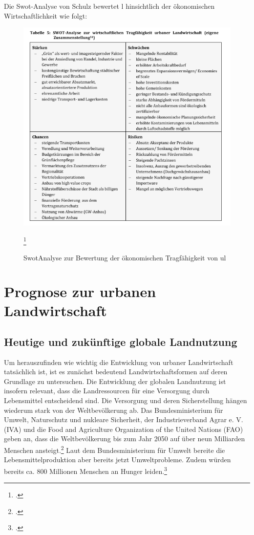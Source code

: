 \documentclass{scrartcl}
\begin{document}
 
 Die Swot-Analyse von Schulz bewertet l hinsichtlich der ökonomischen Wirtschaftlichkeit wie folgt:
 
\begin{figure}[htbp]
\centering
\includegraphics[width=14cm]{image_folder/swot_kSchulz.png}
\caption{SwotAnalyse zur Bewertung der ökonomischen Tragfähigkeit von \acs{ul}}
\label{fig:SwotUL}\footcite[S.32]{Schulz2013UrbaneLandmanagements}
\end{figure} 
 
\section{Prognose zur urbanen Landwirtschaft}


\subsection{Heutige und zukünftige globale Landnutzung}

Um herauszufinden wie wichtig die Entwicklung von urbaner Landwirtschaft tatsächlich ist, ist es zunächst bedeutend Landwirtschaftsformen auf deren Grundlage zu untersuchen. Die Entwicklung der globalen Landnutzung ist insofern relevant, dass die Landressourcen für eine Versorgung durch Lebensmittel entscheidend sind. Die Versorgung und deren Sicherstellung hängen wiederum stark von der Weltbevölkerung ab. Das Bundesministerium für Umwelt, Naturschutz und nukleare Sicherheit, der Industrieverband Agrar e. V. (IVA) und die Food and Agriculture Organization of the United Nations (FAO) geben an, dass die Weltbevölkerung bis zum Jahr 2050 auf über neun Milliarden Menschen ansteigt.\footcites[Vgl.]{BMU2016GlobaleUmweltfolgen}[sowie]{Agrar0NahrungsmittelLandwirtschaft}[und]{FAO2009How2050} Laut dem Bundesministerium für Umwelt bereite die Lebensmittelproduktion aber bereits jetzt Umweltprobleme. Zudem würden bereits ca. 800 Millionen Menschen an Hunger leiden.\footcite[Vgl.]{BMU2016GlobaleUmweltfolgen} 
\end{document}
